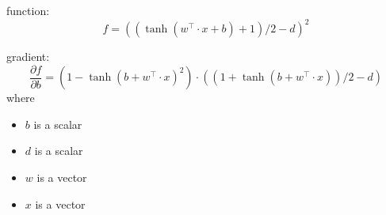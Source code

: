 \documentclass[12pt]{article}
\begin{document}
function:
\[
  f = ((\tanh(w^\top \cdot x+b)+1)/2-d)^{2}
\]

gradient:
\[
  \frac{\partial f}{\partial b} = (1-\tanh(b+w^\top \cdot x)^{2})\cdot ((1+\tanh(b+w^\top \cdot x))/2-d)
\]
where
\begin{itemize}
  \item $b$ is a scalar
  \item $d$ is a scalar
  \item $w$ is a vector
  \item $x$ is a vector
\end{itemize}
\end{document}
